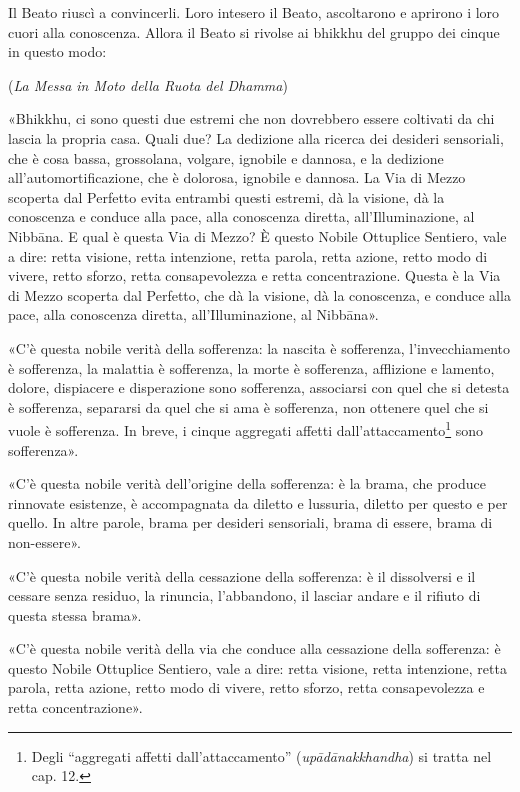 

Il Beato riuscì a convincerli. Loro intesero il Beato, ascoltarono e
aprirono i loro cuori alla conoscenza. Allora il Beato si rivolse ai
bhikkhu del gruppo dei cinque in questo modo:


(\emph{La Messa in Moto della Ruota del Dhamma})


«Bhikkhu, ci sono questi due estremi che non dovrebbero essere coltivati
da chi lascia la propria casa. Quali due? La dedizione alla ricerca dei
desideri sensoriali, che è cosa bassa, grossolana, volgare, ignobile e
dannosa, e la dedizione all’automortificazione, che è dolorosa,
ignobile e dannosa. La Via di Mezzo scoperta dal Perfetto evita entrambi
questi estremi, dà la visione, dà la conoscenza e conduce alla pace,
alla conoscenza diretta, all’Illuminazione, al Nibbāna. E qual è questa
Via di Mezzo? È questo Nobile Ottuplice Sentiero, vale a dire: retta
visione, retta intenzione, retta parola, retta azione, retto modo di
vivere, retto sforzo, retta consapevolezza e retta concentrazione.
Questa è la Via di Mezzo scoperta dal Perfetto, che dà la visione, dà la
conoscenza, e conduce alla pace, alla conoscenza diretta,
all’Illuminazione, al Nibbāna».


«C’è questa nobile verità della sofferenza: la nascita è sofferenza,
l’invecchiamento è sofferenza, la malattia è sofferenza, la morte è
sofferenza, afflizione e lamento, dolore, dispiacere e disperazione sono
sofferenza, associarsi con quel che si detesta è sofferenza, separarsi
da quel che si ama è sofferenza, non ottenere quel che si vuole è
sofferenza. In breve, i cinque aggregati affetti
dall’attaccamento\footnote{Degli “aggregati affetti dall’attaccamento” (\emph{upādānakkhandha}) si tratta nel cap. 12.} sono sofferenza».


«C’è questa nobile verità dell’origine della sofferenza: è la brama, che
produce rinnovate esistenze, è accompagnata da diletto e lussuria,
diletto per questo e per quello. In altre parole, brama per desideri
sensoriali, brama di essere, brama di non-essere».


«C’è questa nobile verità della cessazione della sofferenza: è il
dissolversi e il cessare senza residuo, la rinuncia, l’abbandono, il
lasciar andare e il rifiuto di questa stessa brama».


«C’è questa nobile verità della via che conduce alla cessazione della
sofferenza: è questo Nobile Ottuplice Sentiero, vale a dire: retta
visione, retta intenzione, retta parola, retta azione, retto modo di
vivere, retto sforzo, retta consapevolezza e retta concentrazione».


